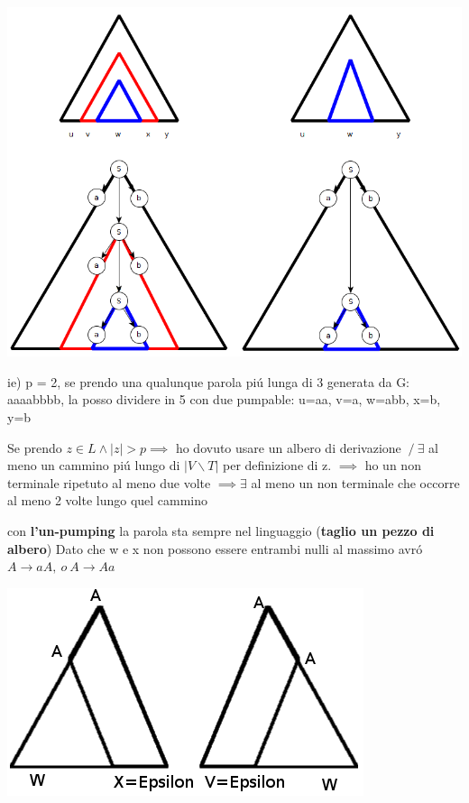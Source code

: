 \begin{center}
	\includegraphics[scale=0.4]{Chapters/Img/c01_05.png}\\
\end{center}

ie) p = 2, se prendo una qualunque parola pi\'u lunga di 3 generata da G: aaaabbbb, la posso dividere in 5 con due pumpable:
u=aa, v=a, w=abb, x=b, y=b 

Se prendo $z\in L \land |z| > p \implies $ ho dovuto usare un albero di derivazione $\ / \ \exists $ al meno un cammino pi\'u lungo 
di $|V\backslash T|$ per definizione di z.
$\implies $ ho un non terminale ripetuto al meno due volte 
$\implies \exists$ al meno un non terminale che occorre al meno 2 volte lungo quel cammino

con \textbf{l'un-pumping} la parola sta sempre nel linguaggio (\textbf{taglio un pezzo di albero}) 
Dato che w e x non possono essere entrambi nulli al massimo avr\'o  $A \rightarrow aA,\ o\ A \rightarrow Aa$

\begin{center}
\includegraphics[scale=0.4]{Chapters/Img/c01_03.png}
\end{center}

